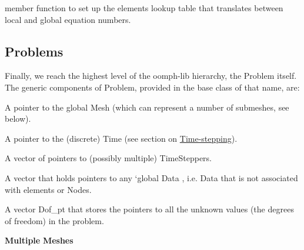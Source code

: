  member function to set up the elements\textquotesingle{} lookup table that translates between local and global equation numbers.\hypertarget{index_problems}{}\subsection{Problems}\label{index_problems}
Finally, we reach the highest level of the {\ttfamily oomph-\/lib} hierarchy, the {\ttfamily Problem} itself. The generic components of {\ttfamily Problem}, provided in the base class of that name, are\+:
\begin{DoxyItemize}
\item A pointer to the global {\ttfamily Mesh} (which can represent a number of submeshes, see below).
\item A pointer to the (discrete) {\ttfamily Time} (see section on \hyperlink{index_timestepping}{Time-\/stepping}).
\item A vector of pointers to (possibly multiple) {\ttfamily Time\+Steppers}.
\item A vector that holds pointers to any `global {\ttfamily Data} \textquotesingle{}, i.\+e. {\ttfamily Data} that is not associated with elements or {\ttfamily Nodes}.
\item A vector {\ttfamily Dof\+\_\+pt} that stores the pointers to all the unknown values (the degrees of freedom) in the problem.
\end{DoxyItemize}

{\bfseries Multiple} {\bfseries Meshes} 

